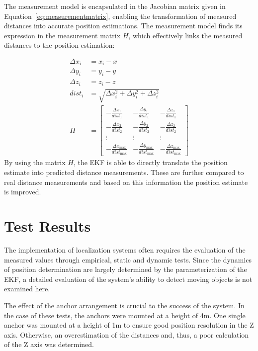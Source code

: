 \documentclass[conference, a4paper]{IEEEtran}
\begin{document}
The measurement model is encapsulated in the Jacobian matrix given in Equation~\ref{eq:measurementmatrix},
enabling the transformation of measured distances into accurate position estimations. 
The measurement model finds its expression in the measurement matrix $H$, 
which effectively links the measured distances to the position estimation:

\begin{equation}
	\begin{aligned}
		\Delta x_i &= x_i - x \\
		\Delta y_i &= y_i - y \\
		\Delta z_i &= z_i - z \\
		dist_i &= \sqrt{{\Delta x_i^2 + \Delta y_i^2 + \Delta z_i^2}} \\
		H &= \begin{bmatrix}
			-\frac{{\Delta x_1}}{{dist_1}} & -\frac{{\Delta y_1}}{{dist_1}} & -\frac{{\Delta z_1}}{{dist_1}} \\
			-\frac{{\Delta x_2}}{{dist_2}} & -\frac{{\Delta y_2}}{{dist_2}} & -\frac{{\Delta z_2}}{{dist_2}} \\
			\vdots & \vdots & \vdots \\
			-\frac{{\Delta x_{\text{max}}}}{{dist_{\text{max}}}} & -\frac{{\Delta y_{\text{max}}}}{{dist_{\text{max}}}} & -\frac{{\Delta z_{\text{max}}}}{{dist_{\text{max}}}}
		\end{bmatrix}
	\end{aligned}
	\label{eq:measurementmatrix}
\end{equation}
By using the matrix $H$, the \ac{EKF} is able to directly translate the position estimate into predicted distance measurements.
These are further compared to real distance measurements and based on this information the position estimate is improved.


\section{Test Results}\label{section:tests}
The implementation of localization systems often requires the evaluation of the measured values through empirical,
static and dynamic tests.
Since the dynamics of position determination are largely determined by the parameterization of the \ac{EKF},
a detailed evaluation of the system's ability to detect moving objects is not examined here.

The effect of the anchor arrangement is crucial to the success of the system.
In the case of these tests, the anchors were mounted at a height of 4m.
One single anchor was mounted at a height of 1m to ensure good position resolution in the Z axis.
Otherwise, an overestimation of the distances and, thus, a poor calculation of the Z axis was determined.
\end{document}
